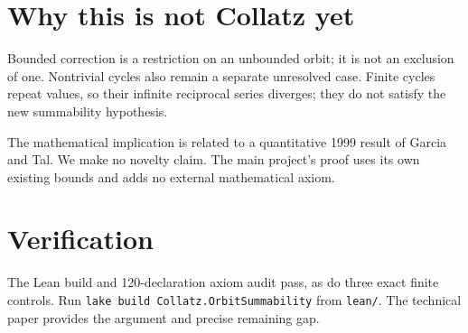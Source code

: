 \documentclass[10pt]{article}
\begin{document}
\section*{Why this is not Collatz yet}
Bounded correction is a restriction on an unbounded orbit; it is not an
exclusion of one. Nontrivial cycles also remain a separate unresolved case.
Finite cycles repeat values, so their infinite reciprocal series diverges;
they do not satisfy the new summability hypothesis.

The mathematical implication is related to a quantitative 1999 result of
Garcia and Tal. We make no novelty claim. The main project's proof uses its
own existing bounds and adds no external mathematical axiom.

\section*{Verification}
The Lean build and 120-declaration axiom audit pass, as do three exact finite
controls. Run \texttt{lake build Collatz.OrbitSummability} from \texttt{lean/}.
The technical paper provides the argument and precise remaining gap.
\end{document}
